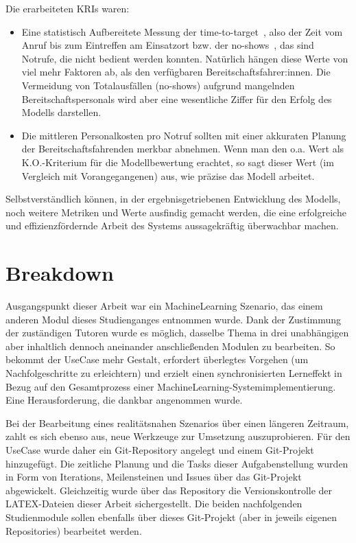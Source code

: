 Die erarbeiteten KRIs waren:
\begin{itemize}
 \itemsep-8pt
 \item Eine statistisch Aufbereitete Messung der \glqq time-to-target\grqq\ , also der Zeit vom Anruf bis zum Eintreffen am Einsatzort bzw. der \glqq no-shows\grqq\ , das sind Notrufe, die nicht bedient werden konnten. Natürlich hängen diese Werte von viel mehr Faktoren ab, als den verfügbaren Bereitschaftsfahrer:innen. Die Vermeidung von Totalausfällen (no-shows) aufgrund mangelnden Bereitschaftspersonals wird aber eine wesentliche Ziffer für den Erfolg des Modells darstellen.
 \item Die mittleren Personalkosten pro Notruf sollten mit einer akkuraten Planung der Bereitschaftsfahrenden merkbar abnehmen. Wenn man den o.a. Wert als K.O.-Kriterium für die Modellbewertung erachtet, so sagt dieser Wert (im Vergleich mit Vorangegangenen) aus, wie präzise das Modell arbeitet.
\end{itemize} 

Selbstverständlich können, in der ergebnisgetriebenen Entwicklung des Modells, noch weitere Metriken und Werte ausfindig gemacht werden, die eine erfolgreiche und effizienzfördernde Arbeit des Systems aussagekräftig überwachbar machen.

\chapter{Breakdown}

Ausgangspunkt dieser Arbeit war ein MachineLearning Szenario, das einem anderen Modul dieses Studienganges entnommen wurde. Dank der Zustimmung der zuständigen Tutoren wurde es möglich, dasselbe Thema in drei unabhängigen aber inhaltlich dennoch aneinander anschließenden Modulen zu bearbeiten. So bekommt der UseCase mehr Gestalt, erfordert überlegtes Vorgehen (um Nachfolgeschritte zu erleichtern) und erzielt einen synchronisierten Lerneffekt in Bezug auf den Gesamtprozess einer MachineLearning-Systemimplementierung. Eine Herausforderung, die dankbar angenommen wurde.

Bei der Bearbeitung eines realitätsnahen Szenarios über einen längeren Zeitraum, zahlt es sich ebenso aus, neue Werkzeuge zur Umsetzung auszuprobieren. Für den UseCase wurde daher ein Git-Repository angelegt und einem Git-Projekt hinzugefügt. Die zeitliche Planung und die Tasks dieser Aufgabenstellung wurden in Form von Iterations, Meilensteinen und Issues über das Git-Projekt abgewickelt. Gleichzeitig wurde über das Repository die Versionskontrolle der LATEX-Dateien dieser Arbeit sichergestellt. Die beiden nachfolgenden Studienmodule sollen ebenfalls über dieses Git-Projekt (aber in jeweils eigenen Repositories) bearbeitet werden.

